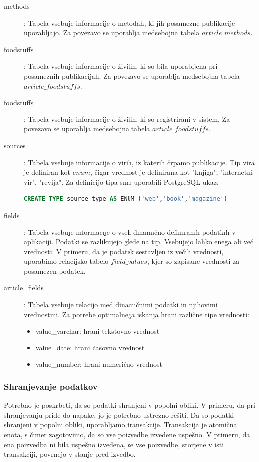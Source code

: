 \documentclass[a4paper, 12pt]{book}
\begin{document}
\begin{description}
\item[methods]: Tabela vsebuje informacije o metodah, ki jih posamezne publikacije uporabljajo. Za povezavo se uporablja medsebojna tabela $article\_methods$.

\item[foodstuffs]: Tabela vsebuje informacije o živilih, ki so bila uporabljena pri posameznih publikacijah. Za povezavo se uporablja medsebojna tabela $article\_foodstuffs$.

\item[foodstuffs]: Tabela vsebuje informacije o živilih, ki so registrirani v sistem. Za povezavo se uporablja medsebojna tabela $article\_foodstuffs$.

\item[sources]: Tabela vsebuje informacije o virih, iz katerih črpamo publikacije. Tip vira je definiran kot $enum$, čigar vrednost je definirana kot "knjiga", "internetni vir", "revija". Za definicijo tipa smo uporabili PostgreSQL ukaz:
\begin{lstlisting}[language=sql, style=mystyle]
CREATE TYPE source_type AS ENUM ('web','book','magazine')
\end{lstlisting}

\item[fields]: Tabela vsebuje informacije o vseh dinamično definiranih podatkih v aplikaciji. Podatki se razlikujejo glede na tip. Vsebujejo lahko enega ali več vrednosti. V primeru, da je podatek sestavljen iz večih vrednosti, uporabimo relacijsko tabelo $field\_values$, kjer so zapisane vrednosti za posamezen podatek.

\item[article\_fields]: Tabela vsebuje relacijo med dinamičnimi podatki in njihovimi vrednostmi. Za potrebe optimalnega iskanja hrani različne tipe vrednosti:
\begin{itemize}
\item value\_varchar: hrani tekstovno vrednost
\item value\_date: hrani časovno vrednost
\item value\_number: hrani numerično vrednost
\end{itemize}
\end{description}

\subsubsection{Shranjevanje podatkov}
Potrebno je poskrbeti, da so podatki shranjeni v popolni obliki. V primeru, da pri shranjevanju pride do napake, jo je potrebno ustrezno rešiti. Da so podatki shranjeni v popolni obliki, uporabljamo transakcije. Transakcija je atomična enota, s čimer zagotovimo, da so vse poizvedbe izvedene uspešno. V primeru, da ena poizvedba ni bila uspešno izvedena, se vse poizvedbe, storjene v isti transakciji, povrnejo v stanje pred izvedbo.
\end{document}
